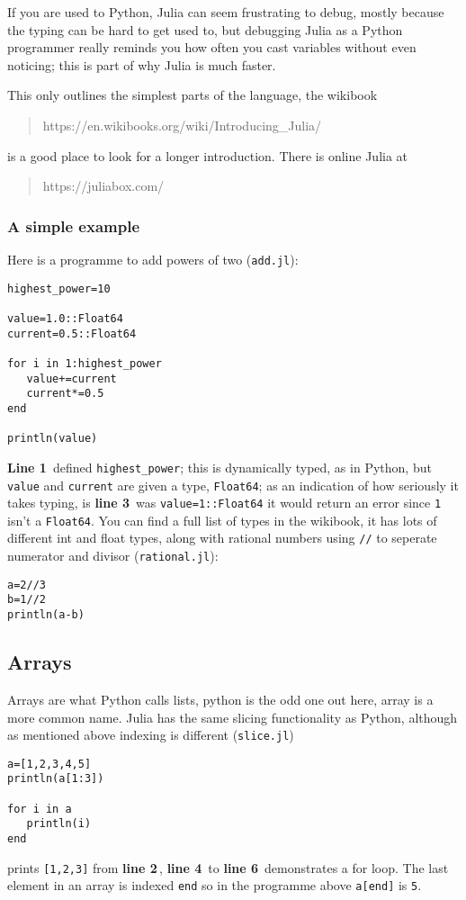\documentclass[12pt]{article}
\newcommand{\lnn}[1]{\textbf{line #1}\,}
\newcommand{\Lnn}[1]{\textbf{Line #1}\,}
\begin{document}
If you are used to Python, Julia can seem frustrating to debug, mostly
because the typing can be hard to get used to, but debugging Julia as
a Python programmer really reminds you how often you cast variables
without even noticing; this is part of why Julia is much faster.

This only outlines the simplest parts of the language, the wikibook
\begin{quote}
https://en.wikibooks.org/wiki/Introducing\_Julia/
\end{quote}
is a good place to look for a longer introduction. There is online Julia at
\begin{quote}
https://juliabox.com/
\end{quote}

\subsubsection*{A simple example}

Here is a programme to add powers of two (\texttt{add.jl}):
\begin{lstlisting}[numbers=right]
highest_power=10

value=1.0::Float64
current=0.5::Float64

for i in 1:highest_power
   value+=current
   current*=0.5
end

println(value)
\end{lstlisting}
\Lnn{1} defined \texttt{highest\_power}; this is dynamically typed, as
in Python, but \texttt{value} and \texttt{current} are given a type,
\texttt{Float64}; as an indication of how seriously it takes typing,
is \lnn{3} was \texttt{value=1::Float64} it would return an error
since \texttt{1} isn't a \texttt{Float64}. You can find a full list of
types in the wikibook, it has lots of different int and float types,
along with rational numbers using \texttt{//} to seperate numerator and divisor (\texttt{rational.jl}):
\begin{lstlisting}[numbers=right]
a=2//3
b=1//2
println(a-b)
\end{lstlisting}

\subsection*{Arrays}
Arrays are what Python calls lists, python is the odd one out here,
array is a more common name. Julia has the same slicing functionality
as Python, although as mentioned above indexing is different (\texttt{slice.jl})
\begin{lstlisting}[numbers=right]
a=[1,2,3,4,5]
println(a[1:3])

for i in a
   println(i)
end

\end{lstlisting}
prints \texttt{[1,2,3]} from \lnn{2}, \lnn{4} to \lnn{6} demonstrates
a for loop. The last element in an array is indexed \texttt{end} so in
the programme above \texttt{a[end]} is \texttt{5}.
\end{document}
